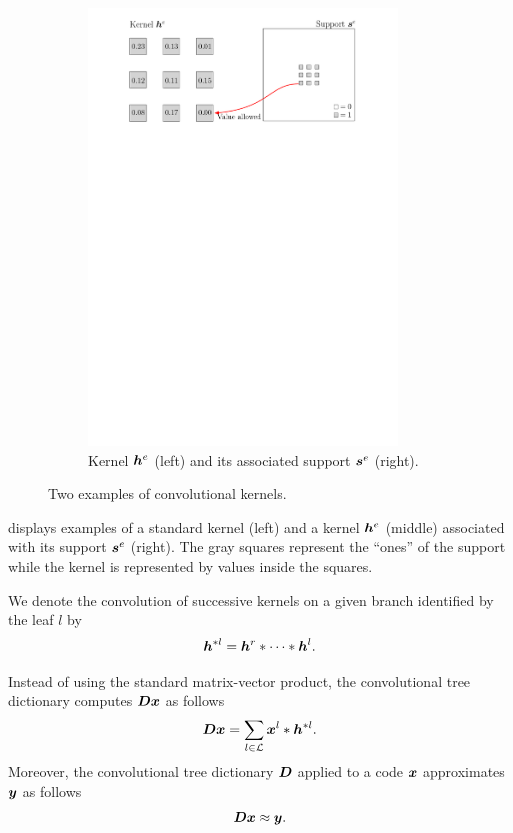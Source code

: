 \begin{figure}[!ht]
\begin{subfigure}[b]{0.79\textwidth}
\includegraphics[width=0.90\textwidth]{figures/kernel-h_e.pdf}
\caption{Kernel $\bm{h}^e$ (left) and its associated support $\bm{s}^e$ (right).}\label{fig_example_kernel-h_e}
\end{subfigure}
\caption{Two examples of convolutional kernels.}\label{fig_example_kernel}
\end{figure}

\noindent
{} displays examples of a standard kernel (left) and a kernel $\bm{h}^e$ (middle) associated with its support $\bm{s}^e$ (right). The gray squares represent the “ones” of the support while the kernel is represented by values inside the squares.

\noindent
We denote the convolution of successive kernels on a given branch identified by the leaf $l$ by
\begin{equation*}\bm{h}^{*l} = \bm{h}^r * \dots * \bm{h}^l.\end{equation*}

\noindent
Instead of using the standard matrix-vector product, the convolutional tree dictionary computes $\bm{D}\bm{x}$ as follows
\begin{align}
	\bm{D}\bm{x} = \sum_{l \in \mathcal L} \bm{x}^l * \bm{h}^{*l}.\label{eq_Dx_as_conv}
\end{align}
Moreover, the convolutional tree dictionary $\bm{D}$ applied to a code $\bm{x}$ approximates $\bm{y}$ as follows
\begin{equation*}\bm{D}\bm{x} \approx \bm{y}. \end{equation*}

